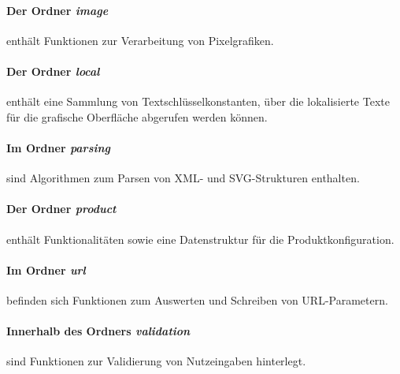 \paragraph{Der Ordner \emph{image}} enthält Funktionen zur Verarbeitung von Pixelgrafiken.  

\paragraph{Der Ordner \emph{local}} enthält eine Sammlung von Textschlüsselkonstanten, über die lokalisierte Texte für die grafische Oberfläche abgerufen werden können.  

\paragraph{Im Ordner \emph{parsing}} sind Algorithmen zum Parsen von XML- und SVG-Strukturen enthalten.

\paragraph{Der Ordner \emph{product}} enthält Funktionalitäten sowie eine Datenstruktur für die Produktkonfiguration.   

\paragraph{Im Ordner \emph{url}} befinden sich Funktionen zum Auswerten und Schreiben von URL-Parametern.

\paragraph{Innerhalb des Ordners \emph{validation}} sind Funktionen zur Validierung von Nutzeingaben hinterlegt.





